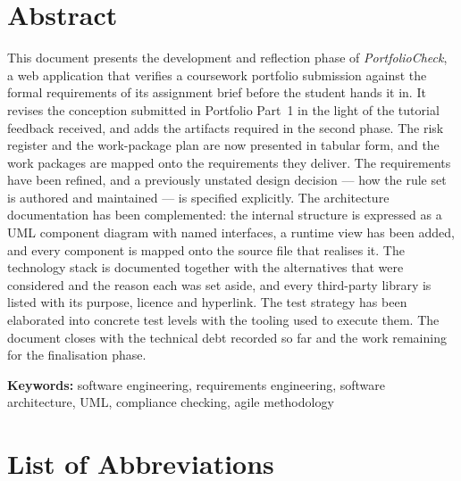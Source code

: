 \documentclass[a4paper,11pt]{article}
\begin{document}
\section*{Abstract}

This document presents the development and reflection phase of
\textit{PortfolioCheck}, a web application that verifies a coursework portfolio
submission against the formal requirements of its assignment brief before the
student hands it in. It revises the conception submitted in Portfolio Part~1 in
the light of the tutorial feedback received, and adds the artifacts required in
the second phase. The risk register and the work-package plan are now presented
in tabular form, and the work packages are mapped onto the requirements they
deliver. The requirements have been refined, and a previously unstated design
decision --- how the rule set is authored and maintained --- is specified
explicitly. The architecture documentation has been complemented: the internal
structure is expressed as a UML component diagram with named interfaces, a
runtime view has been added, and every component is mapped onto the source file
that realises it. The technology stack is documented together with the
alternatives that were considered and the reason each was set aside, and every
third-party library is listed with its purpose, licence and hyperlink. The test
strategy has been elaborated into concrete test levels with the tooling used to
execute them. The document closes with the technical debt recorded so far and
the work remaining for the finalisation phase.

\textbf{Keywords:} software engineering, requirements engineering, software
architecture, UML, compliance checking, agile methodology

\newpage
\tableofcontents
\vspace{0.6cm}
\listoffigures
\vspace{0.3cm}
\listoftables
\newpage

\section*{List of Abbreviations}
\end{document}
